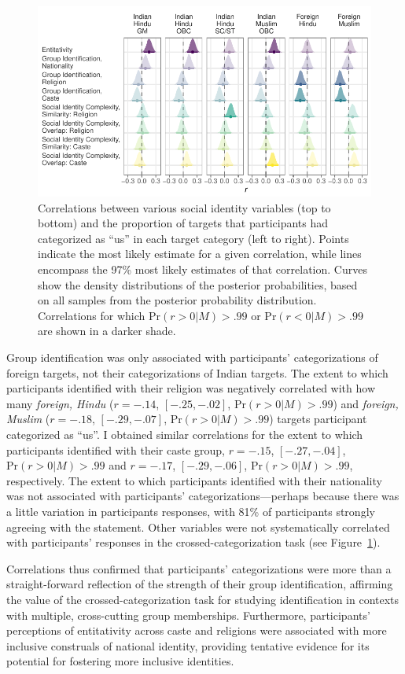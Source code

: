 \documentclass[12pt, a4paper]{article}
\begin{document}
\begin{figure}
\centering
\includegraphics{../figures/appendices/appendices-e-1}
\caption[Correlations between social identity variables and target categorizations]{Correlations between various social identity variables (top to bottom) and the proportion of targets that participants had categorized as ``us'' in each target category (left to right). Points indicate the most likely estimate for a given correlation, while lines encompass the 97\% most likely estimates of that correlation. Curves show the density distributions of the posterior probabilities, based on all samples from the posterior probability distribution. Correlations for which $\text{Pr} (r > 0| M) > .99$ or $\text{Pr} (r < 0| M) > .99$ are shown in a darker shade.}
\label{fig:e-1}
\end{figure}

Group identification was only associated with participants' categorizations of foreign targets, not their categorizations of Indian targets. The extent to which participants identified with their religion was negatively correlated with how many \emph{foreign, Hindu} ($r = -.14$, $[-.25, -.02]$, $\text{Pr} (r > 0| M) > .99$) and \emph{foreign, Muslim} ($r = -.18$, $[-.29, -.07]$, $\text{Pr} (r > 0| M) > .99$) targets participant categorized as ``us''. I obtained similar correlations for the extent to which participants identified with their caste group, $r = -.15$, $[-.27, -.04]$, $\text{Pr} (r > 0| M) > .99$ and $r = -.17$, $[-.29, -.06]$, $\text{Pr} (r > 0| M) > .99$, respectively. The extent to which participants identified with their nationality was not associated with participants' categorizations---perhaps because there was a little variation in participants responses, with 81\% of participants strongly agreeing with the statement. Other variables were not systematically correlated with participants' responses in the crossed-categorization task (see Figure~\ref{fig:e-1}).

Correlations thus confirmed that participants' categorizations were more than a straight-forward reflection of the strength of their group identification, affirming the value of the crossed-categorization task for studying identification in contexts with multiple, cross-cutting group memberships. Furthermore, participants' perceptions of entitativity across caste and religions were associated with more inclusive construals of national identity, providing tentative evidence for its potential for fostering more inclusive identities.



\end{document}
